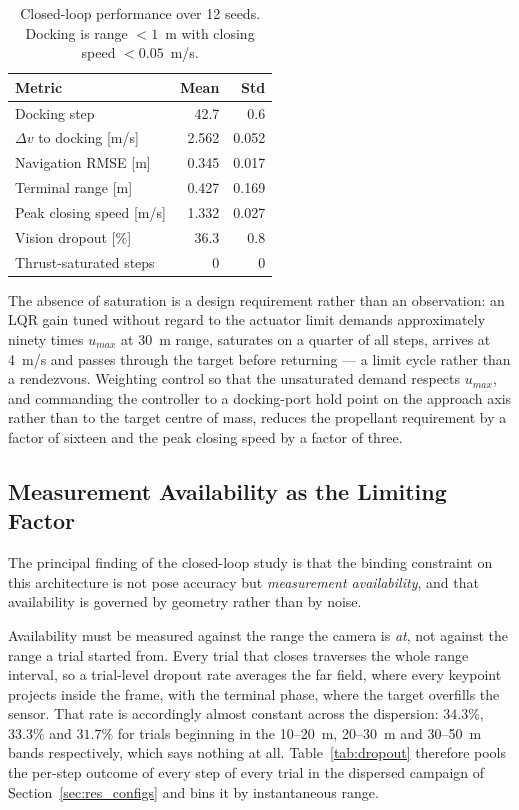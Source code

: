 \begin{table}[!tb]
\caption{Closed-loop performance over 12 seeds. Docking is range $<1$~m with
closing speed $<0.05$~m/s.}
\label{tab:closedloop}
\centering
\begin{tabular}{lrr}
\hline
Metric & Mean & Std \\
\hline
Docking step                & 42.7  & 0.6 \\
$\Delta v$ to docking [m/s] & 2.562 & 0.052 \\
Navigation RMSE [m]         & 0.345 & 0.017 \\
Terminal range [m]          & 0.427 & 0.169 \\
Peak closing speed [m/s]    & 1.332 & 0.027 \\
Vision dropout [\%]         & 36.3  & 0.8 \\
Thrust-saturated steps      & 0     & 0 \\
\hline
\end{tabular}
\end{table}

The absence of saturation is a design requirement rather than an
observation: an LQR gain tuned without regard to the actuator limit demands
approximately ninety times $u_{max}$ at 30~m range, saturates on a quarter of
all steps, arrives at 4~m/s and passes through the target before returning ---
a limit cycle rather than a rendezvous. Weighting control so that the
unsaturated demand respects $u_{max}$, and commanding the controller to a
docking-port hold point on the approach axis rather than to the target centre
of mass, reduces the propellant requirement by a factor of sixteen and the
peak closing speed by a factor of three.

\subsection{Measurement Availability as the Limiting Factor}
\label{sec:res_dropout}

The principal finding of the closed-loop study is that the binding constraint
on this architecture is not pose accuracy but \emph{measurement
availability}, and that availability is governed by geometry rather than by
noise.

Availability must be measured against the range the camera is \emph{at}, not
against the range a trial started from. Every trial that closes traverses the
whole range interval, so a trial-level dropout rate averages the far field,
where every keypoint projects inside the frame, with the terminal phase, where
the target overfills the sensor. That rate is accordingly almost constant
across the dispersion:
$34.3\%$, $33.3\%$ and $31.7\%$ for trials beginning in the 10--20~m, 20--30~m
and 30--50~m bands respectively, which says nothing at all.
Table~\ref{tab:dropout} therefore pools the per-step outcome of every step of
every trial in the dispersed campaign of Section~\ref{sec:res_configs} and
bins it by instantaneous range.

